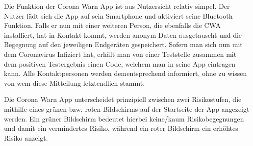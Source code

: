 \documentclass[conference]{IEEEtran}
\begin{document}
Die Funktion der Corona Warn App ist aus Nutzersicht relativ simpel. Der Nutzer lädt sich die App auf sein Smartphone und aktiviert seine Bluetooth Funktion. 
Falls er nun mit einer weiteren Person, die ebenfalls die CWA installiert, hat in Kontakt kommt, werden anonym Daten ausgetauscht und die Begegnung auf den jeweiligen Endgeräten gespeichert. 
Sofern man sich nun mit dem Coronavirus Infiziert hat, erhält man von einer Teststelle zusammen mit dem positiven Testergebnis einen Code, welchem man in seine App eintragen kann. 
Alle Kontaktpersonen werden dementsprechend informiert, ohne zu wissen von wem diese Mitteilung letztendlich stammt. 

Die Corona Warn App unterscheidet prinzipiell zwischen zwei Risikostufen, die mithilfe eines grünen bzw. roten Bildschirms auf der Startseite der App angezeigt werden. 
Ein grüner Bildschirm bedeutet hierbei keine/kaum Risikobegegnungen und damit ein vermindertes Risiko, während ein roter Bildschirm ein erhöhtes Risiko anzeigt.
\end{document}
